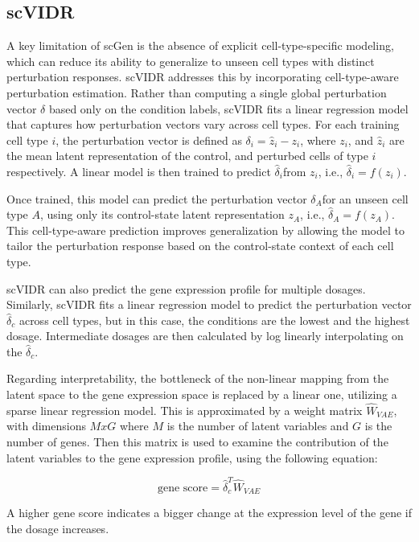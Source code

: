 \documentclass[12pt, a4paper]{article}
\begin{document}
\subsection{scVIDR}
 

A key limitation of scGen is the absence of explicit cell-type-specific modeling, which can reduce its ability to generalize to unseen cell types with distinct perturbation responses.
scVIDR addresses this by incorporating cell-type-aware perturbation estimation. Rather than computing a single global perturbation vector $\delta$ based only on the condition labels, scVIDR fits a linear regression model that captures how perturbation vectors vary across cell types.
For each training cell type $i$, the perturbation vector is defined as $\delta_i = \hat{z}_i - z_i$,
where $z_i$​, and $\hat{z}_i$ are the mean latent representation of the control, and perturbed cells of type $i$ respectively.
A linear model is then trained to predict $\hat{\delta}_i$​ from $z_i$, i.e., $\hat{\delta}_i = f(z_i)$.


Once trained, this model can predict the perturbation vector $\delta_A$​ for an unseen cell type $A$, using only its control-state latent representation $z_A$, i.e., $\hat{\delta}_A = f(z_A)$.
This cell-type-aware prediction improves generalization by allowing the model to tailor the perturbation response based on the control-state context of each cell type.

scVIDR can also predict the gene expression profile for multiple dosages. Similarly, scVIDR fits a linear regression model to predict the perturbation vector $\hat{\delta}_c$ across cell types, but in this case, the conditions are the lowest and the highest dosage. Intermediate dosages are then calculated by log linearly interpolating on the $\hat{\delta}_c$.

Regarding interpretability, the bottleneck of the non-linear mapping from the latent space to the gene expression space is replaced by a linear one, utilizing a sparse linear regression model. This is approximated by a weight matrix $\hat{W}_{VAE}$, with dimensions $MxG$ where $M$ is the number of latent variables and $G$ is the number of genes. Then this matrix is used to examine the contribution of the latent variables to the gene expression profile, using the following equation:

\[\text{gene score} = \hat{\delta}_c^T \hat{W}_{VAE}\]

A higher gene score indicates a bigger change at the expression level of the gene if the dosage increases.
\end{document}
